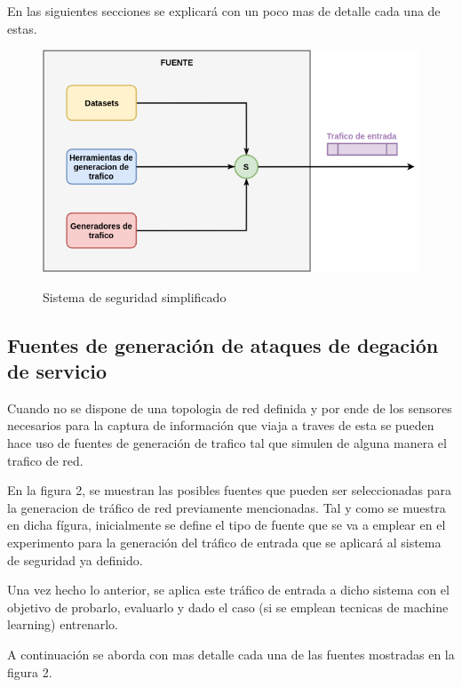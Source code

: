 \documentclass[12pt]{article}
\begin{document}
En las siguientes secciones se explicará con un poco mas de detalle
cada una de estas.

\begin{figure}[htbp]
\begin{center}
\includegraphics[scale=0.5]{sources.png}\\[1cm] %
\caption{Sistema de seguridad simplificado}
\end{center}
\end{figure}


\subsection{Fuentes de generación de ataques de degación de servicio}


Cuando no se dispone de una topologia de red definida y por ende de los sensores necesarios para la captura de información que viaja a traves de esta se pueden hace uso de fuentes de generación de trafico tal que simulen de alguna manera el trafico de red.

En la figura 2, se muestran las posibles fuentes que pueden ser
seleccionadas para la generacion de tráfico de red previamente
mencionadas. Tal y como se muestra en dicha fígura, inicialmente se
define el tipo de fuente que se va a emplear en el experimento para la
generación del tráfico de entrada que se aplicará al sistema de
seguridad ya definido.

Una vez hecho lo anterior, se aplica este tráfico de entrada a dicho
sistema con el objetivo de probarlo, evaluarlo y dado el caso (si se
emplean tecnicas de machine learning) entrenarlo.

A continuación se aborda con mas detalle cada una de las fuentes
mostradas en la figura 2.
\end{document}
